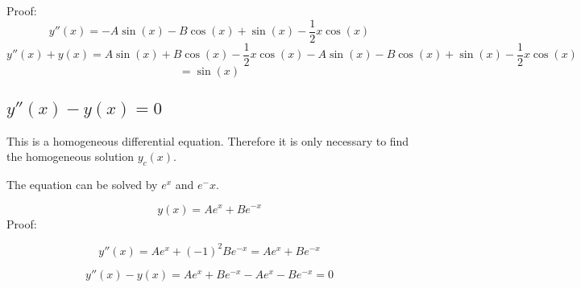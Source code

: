 \documentclass[11pt]{article}
\begin{document}
Proof:
\[ y''(x) = - A\sin(x) - B\cos(x) + \sin(x) - \frac{1}{2} x \cos(x) \]
\[ y''(x) + y(x) = A\sin(x) + B\cos(x) -\frac{1}{2}x\cos(x) - A\sin(x) - B\cos(x) + \sin(x) - \frac{1}{2} x \cos(x) \]
\[ = \sin(x) \]

\subsection{$ y''(x) - y(x) = 0 $}

This is a homogeneous differential equation. Therefore it is only necessary to find the homogeneous solution $y_c(x)$.

The equation can be solved by $e^x$ and $e^-x$. 

\[\boxed{ y(x) = Ae^x + Be^{-x} }\]  
Proof:

\[ y''(x) = Ae^x + (-1)^2Be^{-x} = Ae^x + Be^{-x}\]

\[ y''(x) - y(x) = Ae^x + Be^{-x} - Ae^x - Be^{-x} = 0\]
\end{document}
